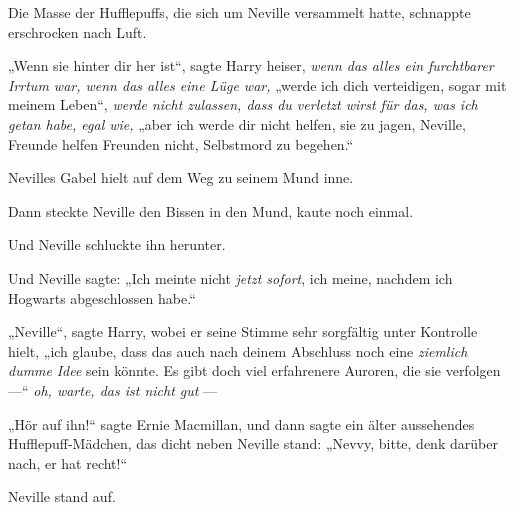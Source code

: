 Die Masse der Hufflepuffs, die sich um Neville versammelt hatte, schnappte erschrocken nach Luft.

„Wenn sie hinter dir her ist“, sagte Harry heiser, \emph{wenn das alles ein furchtbarer Irrtum war, wenn das alles eine Lüge war,} „werde ich dich verteidigen, sogar mit meinem Leben“, \emph{werde nicht zulassen, dass du verletzt wirst für das, was ich getan habe, egal wie,} „aber ich werde dir nicht helfen, sie zu jagen, Neville, Freunde helfen Freunden nicht, Selbstmord zu begehen.“

Nevilles Gabel hielt auf dem Weg zu seinem Mund inne.

Dann steckte Neville den Bissen in den Mund, kaute noch einmal.

Und Neville schluckte ihn herunter.

Und Neville sagte:
„Ich meinte nicht \emph{jetzt sofort}, ich meine, nachdem ich Hogwarts abgeschlossen habe.“

„Neville“, sagte Harry, wobei er seine Stimme sehr sorgfältig unter Kontrolle hielt, „ich glaube, dass das auch nach deinem Abschluss noch eine \emph{ziemlich dumme} \emph{Idee} sein könnte. Es gibt doch viel erfahrenere Auroren, die sie verfolgen —“ \emph{oh, warte, das ist nicht gut} —

„Hör auf ihn!“ sagte Ernie Macmillan, und dann sagte ein älter aussehendes Hufflepuff-Mädchen, das dicht neben Neville stand:
„Nevvy, bitte, denk darüber nach, er hat recht!“

Neville stand auf.

